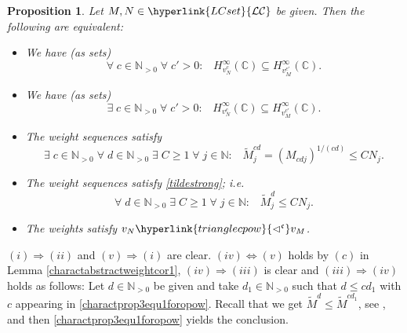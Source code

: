 \documentclass[10pt]{amsart}%
\numberwithin{equation}{section}
\theoremstyle{plain}
\newtheorem{proposition}{Proposition}[section]
\newcommand{\CC}{\mathbb{C}}
\newcommand{\NN}{\mathbb{N}}
\begin{document}
\begin{proposition}\label{charactprop3foropow}
	Let $M,N\in\hyperlink{LCset}{\mathcal{LC}}$ be given. Then the following are equivalent:
	\begin{itemize}
		\item[$(i)$]  We have (as sets)
		\begin{equation*}\label{charactprop3equ0foropow}
			\forall\;c\in\NN_{>0}\;\forall\;c'>0:\;\;\;H^{\infty}_{v^c_N}(\CC)\subseteq H^{\infty}_{v^{c'}_M}(\CC).
		\end{equation*}
		
		\item[$(ii)$] We have (as sets)
		\begin{equation}\label{charactprop3equforopow}
			\exists\;c\in\NN_{>0}\;\forall\;c'>0:\;\;\;H^{\infty}_{v^c_N}(\CC)\subseteq H^{\infty}_{v^{c'}_M}(\CC).
		\end{equation}
		
		\item[$(iii)$] The weight sequences satisfy
		\begin{equation}\label{charactprop3equ1foropow}
			\exists\;c\in\NN_{>0}\;\forall\;d\in\NN_{>0}\;\exists\;C\ge 1\;\forall\;j\in\NN:\;\;\;\widetilde{M}^{cd}_j=(M_{cdj})^{1/(cd)}\le CN_j.
		\end{equation}
		\item[$(iv)$] The weight sequences satisfy \eqref{tildestrong}; i.e.
		$$\forall\;d\in\NN_{>0}\;\exists\;C\ge 1\;\forall\;j\in\NN:\;\;\;\widetilde{M}^d_j\le CN_j.$$
		
		\item[$(v)$] The weights satisfy $v_N\hyperlink{trianglecpow}{\vartriangleleft^{\mathfrak{c}}}v_M$.
	\end{itemize}
\end{proposition}

$(i)\Rightarrow(ii)$ and $(v)\Rightarrow(i)$ are clear. $(iv)\Leftrightarrow(v)$ holds by $(c)$ in Lemma \ref{charactabstractweightcor1}, $(iv)\Rightarrow(iii)$ is clear and $(iii)\Rightarrow(iv)$ holds as follows: Let $d\in\NN_{>0}$ be given and take $d_1\in\NN_{>0}$ such that $d\le cd_1$ with $c$ appearing in \eqref{charactprop3equ1foropow}. Recall that we get $\widetilde{M}^d\le\widetilde{M}^{cd_1}$, see \cite[$(3.26)$, Lemma 3.19]{weightedentirecharacterization}, and then \eqref{charactprop3equ1foropow} yields the conclusion.\vspace{6pt}
\end{document}
